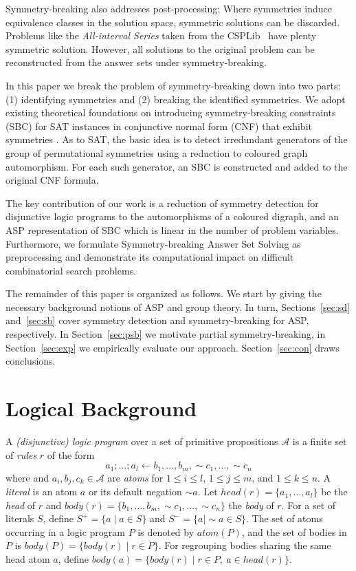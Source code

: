 \documentclass[envcountsame]{llncs}
\newcommand{\alphabet}{\mathcal{A}}
\newcommand{\atom}[1]{atom(#1)}
\newcommand{\head}[1]{head(#1)}
\newcommand{\body}[1]{body(#1)}
\newcommand{\dneg}[0]{\sim\!\!}
\begin{document}
Symmetry-breaking also addresses post-processing: Where symmetries induce equivalence classes in the solution space, symmetric solutions can be discarded. Problems like the \emph{All-interval Series} taken from the CSPLib~\cite{gewa99a} have plenty symmetric solution. However, all solutions to the original problem can be reconstructed from the answer sets under symmetry-breaking.

In this paper we break the problem of symmetry-breaking down into two parts: (1) identifying symmetries and (2) breaking the identified
symmetries. We adopt existing theoretical foundations on introducing sym\-me\-try-breaking constraints (SBC) for SAT instances in conjunctive normal form (CNF) that exhibit symmetries \cite{crgiluro96a,almasa03a,alramasa03a,sa09a}. As to SAT, the basic idea is to detect irredundant generators of the group of permutational symmetries using a reduction to coloured graph automorphism. For each such generator, an SBC is constructed and added to the original CNF formula.

The key contribution of our work is a reduction of symmetry detection for disjunctive logic programs to the automorphisms of a coloured digraph, and an ASP representation of SBC which is linear in the number of problem variables. Furthermore, we formulate Symmetry-breaking Answer Set Solving as preprocessing and demonstrate its computational impact on difficult combinatorial search problems.

The remainder of this paper is organized as follows. We start by giving the necessary background notions of ASP and group theory. In turn, Sections~\ref{sec:sd} and~\ref{sec:sb} cover symmetry detection and symmetry-breaking for ASP, respectively. In Section~\ref{sec:psb} we motivate partial symmetry-breaking, in Section~\ref{sec:exp} we empirically evaluate our approach. Section~\ref{sec:con} draws conclusions.

\section{Logical Background}
A \emph{(disjunctive) logic program} over a set of primitive propositions $\alphabet$ is a finite set of \emph{rules} $r$ of the form
\begin{equation} \label{form:rule}
a_1 ; \dots ; a_l \leftarrow b_1 , \dots , b_m, \dneg c_1 , \dots , \dneg c_n
\end{equation}
where and $a_i, b_j, c_k \in \alphabet$ are \emph{atoms} for $1 \leq i \leq l$, $1 \leq j \leq m$, and $1 \leq k \leq n$.
A \emph{literal} is an atom $a$ or its default negation $\dneg a$.
Let $\head{r} = \{a_1 , \dots , a_l\}$ be the \emph{head} of $r$ and $\body{r} = \{b_1 , \dots , b_m, \dneg c_1 , \dots , \dneg c_n\}$ the \emph{body} of $r$. For a set of literals $S$, define $S^{+} = \{a \mid a \in S\}$ and $S^{-} = \{a \mid \dneg a \in S\}$. The set of atoms occurring in a logic program $P$ is denoted by $\atom{P}$, and the set of bodies in $P$ is $\body{P} = \{ \body{r} \mid r \in P \}$. For regrouping bodies sharing the same head atom $a$, define $\body{a} = \{ \body{r} \mid r \in P,\  a \in \head{r} \}$.
\end{document}
